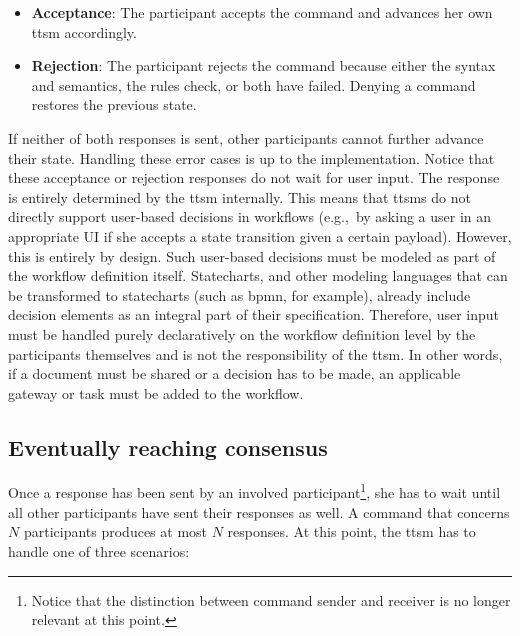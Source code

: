 \begin{itemize}
    \item \textbf{Acceptance}: The participant accepts the command and advances her own \gls{ttsm} accordingly.
    \item \textbf{Rejection}: The participant rejects the command because either the syntax and semantics, the rules check, or both have failed. Denying a command restores the previous state.
\end{itemize}

If neither of both responses is sent, other participants cannot further advance their state. Handling these error cases is up to the implementation. Notice that these acceptance or rejection responses do not wait for user input. The response is entirely determined by the \gls{ttsm} internally. This means that \glspl{ttsm} do not directly support user-based decisions in workflows (e.g.,\ by asking a user in an appropriate UI if she accepts a state transition given a certain payload). However, this is entirely by design. Such user-based decisions must be modeled as part of the workflow definition itself. Statecharts, and other modeling languages that can be transformed to statecharts (such as \gls{bpmn}, for example), already include decision elements as an integral part of their specification. Therefore, user input must be handled purely declaratively on the workflow definition level by the participants themselves and is not the responsibility of the \gls{ttsm}. In other words, if a document must be shared or a decision has to be made, an applicable gateway or task must be added to the workflow.


\subsection{Eventually reaching consensus}
\label{sec:ttsm:proposal:reaching_consensus}
Once a response has been sent by an involved participant\footnote{Notice that the distinction between command sender and receiver is no longer relevant at this point.}, she has to wait until all other participants have sent their responses as well. A command that concerns $N$ participants produces at most $N$ responses. At this point, the \gls{ttsm} has to handle one of three scenarios:

